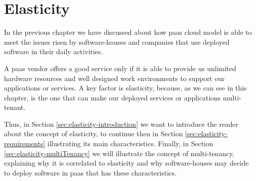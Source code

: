 %
%
\chapter{Elasticity}
\label{cap:solutionSpace}
In the previous chapter we have discussed about how \ac{paas} cloud model is able to meet the issues risen
by software-houses and companies that use deployed software in their daily activities.

A \ac{paas} vendor offers a good service only if it is able to provide us unlimited hardware resources and
well designed work environments to support our applications or services. A key factor is elasticity, because,
as we can see in this chapter, is the one that can make our deployed services or applications multi-tenant.

Thus, in Section \ref{sec:elasticity-introduction} we want to introduce the reader about the concept of
elasticity, to continue then in Section \ref{sec:elasticity-requirements} illustrating its main
characteristics. Finally, in Section \ref{sec:elasticity-multiTenancy} we will illustrate the concept of
multi-tenancy, explaining why it is correlated to elasticity and why software-houses may
decide to deploy software in \ac{paas} that has these characteristics.







